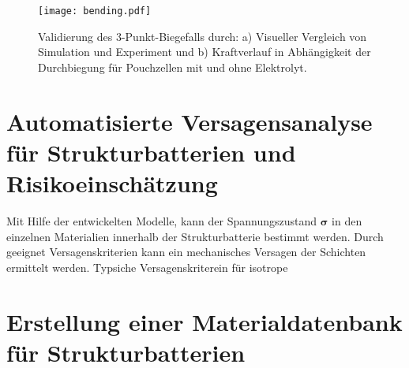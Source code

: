 \begin{figure}[!h]
        \center
		\texttt{[image: bending.pdf]}
		\caption{\label{fig:bending}Validierung des 3-Punkt-Biegefalls durch: a) Visueller Vergleich von Simulation und Experiment und b) Kraftverlauf in Abhängigkeit der Durchbiegung für Pouchzellen mit und ohne Elektrolyt.}
\end{figure}


\section{\label{sec:automated_failure}Automatisierte Versagensanalyse für Strukturbatterien und Risikoeinschätzung}

Mit Hilfe der entwickelten Modelle, kann der Spannungszustand $\boldsymbol{\sigma}$ in den einzelnen Materialien innerhalb der Strukturbatterie bestimmt werden. Durch geeignet Versagenskriterien kann ein mechanisches Versagen der Schichten ermittelt werden.  
Typsiche Versagenskriterein für isotrope 




\section{\label{sec:digitalisation}Erstellung einer Materialdatenbank für Strukturbatterien}